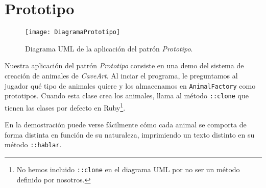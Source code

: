 \section{Prototipo}

\begin{figure}[ht!]
\begin{center}
	\texttt{[image: DiagramaPrototipo]}
\end{center}
\caption{Diagrama UML de la aplicación del patrón \textit{Prototipo}.}
\end{figure}

Nuestra aplicación del patrón \textit{Prototipo} consiste en una demo del sistema de creación de animales de \textit{CaveArt}.
Al inciar el programa, le preguntamos al jugador qué tipo de animales quiere y los almacenamos en \texttt{AnimalFactory} como prototipos.
Cuando esta clase crea los animales, llama al método \texttt{::clone} que tienen las clases por defecto en Ruby\footnote{%
	No hemos incluido \texttt{::clone} en el diagrama UML por no ser un método definido por nosotros.
}.

En la demostración puede verse fácilmente cómo cada animal se comporta de forma distinta en función de su naturaleza, imprimiendo un texto distinto en su método \texttt{::hablar}.

